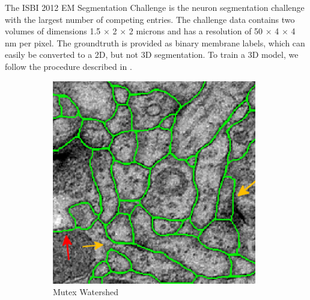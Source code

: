 The ISBI 2012 EM Segmentation Challenge \cite{isbi2012challenge} is the neuron segmentation challenge 
with the largest number of competing entries.
The challenge data contains two volumes of dimensions 1.5 $\times$ 2 $\times$ 2 microns and 
has a resolution of 50 $\times$ 4 $\times$ 4 nm per pixel. The groundtruth is provided as binary membrane
labels, which can easily be converted to a 2D, but not 3D segmentation. To train a 3D model, we follow the procedure
described in \cite{beier2017multicut}. 
\captionsetup[subfigure]{justification=centering, singlelinecheck=off}
\begin{figure}
\centering
    \begin{subfigure}[t]{0.46 \linewidth}
        \centering
        \includegraphics[width=0.98\textwidth]{figures/MWS/images/damws_2.png}
        \caption{Mutex Watershed} \label{fig:mws1}
    \end{subfigure}\hspace{0.5cm}
    \vspace{0.3cm}
    \begin{subfigure}[t]{0.46 \linewidth}
        \centering

\end{subfigure}
\end{figure}
